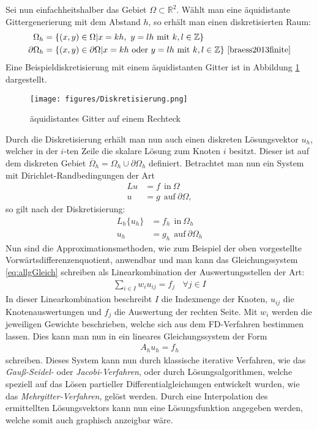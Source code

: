 \documentclass[12pt,titlepage]{article}
\begin{document}
Sei nun einfachheitshalber das Gebiet $\Omega\subset\mathbb{R}^2$. Wählt man eine äquidistante Gittergenerierung mit dem Abstand $h$, so erhält man einen diskretisierten Raum:
\begin{align}
 \Omega_h&=\{(x,y)\in\Omega|x=kh,~y=lh~\text{mit}~k,l\in\mathbb{Z}\}\nonumber\\
 \partial\Omega_h&=\{(x,y)\in\partial\Omega|x=kh~\text{oder}~y=lh~\text{mit}~k,l\in\mathbb{Z}\}\nonumber~\cite{braess2013finite}
\end{align}
Eine Beispieldiskretisierung mit einem äquidistanten Gitter ist in Abbildung \ref{fig:diskGit} dargestellt.
\begin{figure}[ht]
	\centering
	\texttt{[image: figures/Diskretisierung.png]}
	\caption[Diskretiesierung]{äquidistantes Gitter auf einem Rechteck}
	\label{fig:diskGit}
\end{figure}
Durch die Diskretisierung erhält man nun auch einen diskreten Lösungsvektor $u_h$, welcher in der $i$-ten Zeile die skalare Lösung zum Knoten $i$ besitzt. Dieser ist auf dem diskreten Gebiet $\overline{\Omega}_h=\Omega_h\cup\partial\Omega_h$ definiert. Betrachtet man nun ein System mit Dirichlet-Randbedingungen der Art
\begin{align}
 Lu&=f~~\text{in}~\Omega\nonumber\\
 u&=g~~\text{auf}~\partial\Omega\nonumber,
\end{align}
so gilt nach der Diskretisierung:
\begin{align}
 L_h\{u_h\}&=f_h~~\text{in}~\Omega_h\nonumber\\
 u_h&=g_h~~\text{auf}~\partial\Omega_h\label{eq:allgGleich}
\end{align}
Nun sind die Approximationsmethoden, wie zum Beispiel der oben vorgestellte Vorwärtsdifferenzenquotient, anwendbar und man kann das Gleichungssystem \eqref{eq:allgGleich} schreiben als Linearkombination der Auswertungsstellen der Art:
\begin{align}
 \sum_{i\in I}w_iu_{ij}=f_j~~~~\forall j\in I
\end{align}
In dieser Linearkombination beschreibt $I$ die Indexmenge der Knoten, $u_{ij}$ die Knotenauswertungen und $f_j$ die Auswertung der rechten Seite. Mit $w_i$ werden die jeweiligen Gewichte beschrieben, welche sich aus dem FD-Verfahren bestimmen lassen. Dies kann man nun in ein lineares Gleichungssystem der Form
\begin{align}
 A_hu_h=f_h
\end{align}
schreiben. Dieses System kann nun durch klassische iterative Verfahren, wie das \textit{Gauß-Seidel-} oder \textit{Jacobi-Verfahren}, oder durch Lösungsalgorithmen, welche speziell auf das Lösen partieller Differentialgleichungen entwickelt wurden, wie das \textit{Mehrgitter-Verfahren}, gelöst werden. Durch eine Interpolation des ermittellten Lösungsvektors kann nun eine Lösungsfunktion angegeben werden, welche somit auch graphisch anzeigbar wäre.
\end{document}
